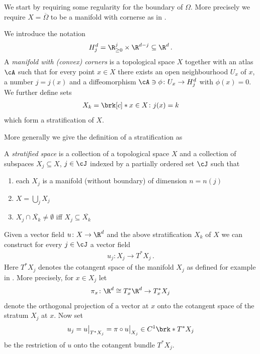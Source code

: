 We start by requiring some regularity for the boundary of $\Omega$.
More precisely we require $X=\overline{\Omega}$ to be a manifold with cornerse as in \cite{Handron2002}.
\begin{definition}
  We introduce the notation
  \begin{align*}
    H_j^d=\R_{\geq0}^j\times\R^{d-j}\subseteq\R^d\,.
  \end{align*}
  A \emph{manifold with (convex) corners} is a topological space $X$ together with an atlas $\cA$ such that for every point
  $x\in X$ there exists an open neighbourhood $U_x$ of $x$, a number $j=j(x)$ and a
  diffeomorphism $\cA\ni\phi\colon U_x\to H_j^d$ with $\phi(x)=0$.
  We further define sets 
  \begin{align}
    X_k=\brk[c]*{x\in X\colon j(x)=k}\label{eq:def_mfCorners_stratification}
  \end{align}
  which form a stratification of $X$.
\end{definition}

More generally we give the definition of a stratification as 
\begin{definition}\label{df:stratified_space}
  A \emph{stratified space} is a collection of a topological space $X$ and a collection of subspaces
  $X_j\subseteq X$, $j\in\cJ$ indexed by a partially ordered set $\cJ$ such that
  \begin{enumerate}
    \item each $X_j$ is a manifold (without boundary) of dimension $n=n(j)$
    \item $X=\bigcup_jX_j$
    \item $X_j\cap \overline{X_k}\neq\emptyset$ iff $X_j\subseteq\overline{X_k}$
  \end{enumerate}
\end{definition}

Given a vector field $u\colon X\to\R^d$ and the above stratification $X_k$ of $X$ we can construct for every
$j\in\cJ$ a vector field
\begin{align*}
  u_j\colon X_j\to T^*X_j\,.
\end{align*}
Here $T^*X_j$ denotes the cotangent space of the manifold $X_j$ as defined for example in \cite[Chapter 6]{Hirsch1994}.
More precisely, for $x\in X_j$ let
\begin{align*}
  \pi_x\colon\R^d\cong T_x^*\R^d\to T_x^*X_{j}
\end{align*}
denote the orthogonal projection of a vector at $x$ onto the cotangent space of the stratum $X_j$ at $x$.
Now set
\begin{align}
  u_j=u\big\vert_{T^*X_j}=\pi\circ u\big\vert_{X_j}\in C^1\brk*{T^*X_j}\label{eq:def_projectionStratification}
\end{align}
be the restriction of $u$ onto the cotangent bundle $T^*X_j$.

